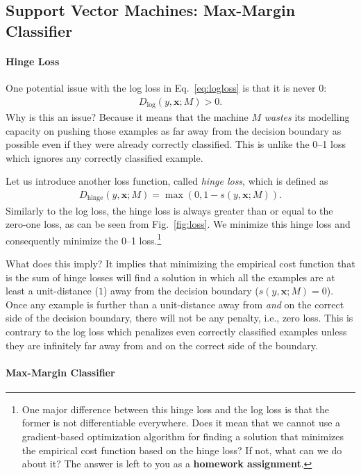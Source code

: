 \documentclass{report}
\newcommand{\vect}[1]{\mathbf{#1}}
\newcommand{\vx}[0]{\vect{x}}
\newcommand{\hinge}{\text{hinge}}
\begin{document}
\subsection{Support Vector Machines: Max-Margin Classifier}
\label{sec:svm}

\paragraph{Hinge Loss}

One potential issue with the log loss in Eq.~\eqref{eq:logloss} is that it is
never $0$: 
\begin{align*}
    D_{\log}(y, \vx; M) > 0.
\end{align*}
Why is this an issue? Because it means that the machine $M$ {\it wastes} its
modelling capacity on pushing those examples as far away from the decision
boundary as possible even if they were already correctly classified. This is
unlike the 0--1 loss which ignores any correctly classified example. 

Let us introduce another loss function, called {\it hinge loss}, which is
defined as
\begin{align*}
    D_{\hinge}(y, \vx; M) = \max(0, 1 - s(y, \vx; M)).
\end{align*}
Similarly to the log loss, the hinge loss is always greater than or equal to the
zero-one loss, as can be seen from Fig.~\ref{fig:loss}. We minimize this hinge
loss and consequently minimize the 0--1 loss.\footnote{
    One major difference between this hinge loss and the log loss is that the
    former is not differentiable everywhere. Does it mean that we cannot use a
    gradient-based optimization algorithm for finding a solution that minimizes
    the empirical cost function based on the hinge loss? If not, what can we do
    about it? The answer is left to you as a {\bf homework assignment}.
}

What does this imply? It implies that minimizing the empirical cost function
that is the sum of hinge losses will find a solution in which all the examples
are at least a unit-distance ($1$) away from the decision boundary ($s(y, \vx;
M) = 0$). Once any example is further than a unit-distance away from  {\it and}
on the correct side of the decision boundary, there will not be any penalty, i.e.,
zero loss. This is contrary to the log loss which penalizes even correctly
classified examples unless they are infinitely far away from and on the correct
side of the boundary.

\paragraph{Max-Margin Classifier}
\end{document}
